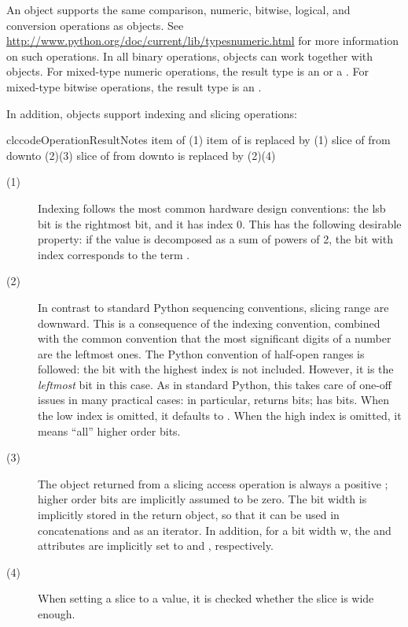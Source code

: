 An  object supports the same comparison, numeric,
bitwise, logical, and conversion operations as  objects. See
\url{http://www.python.org/doc/current/lib/typesnumeric.html} for more
information on such operations. In all binary operations,
 objects can work together with  objects.
For mixed-type numeric operations, the result type is an 
or a . For mixed-type bitwise operations, the result
type is an .

In addition,  objects support indexing and slicing
operations:

\begin{tableiii}{clc}{code}{Operation}{Result}{Notes}
	  {item  of }
	  {(1)}
	  {item  of  is replaced by } 
          {(1)}
          {slice of  from  downto } 
          {(2)(3)}
  	  {slice of  from  downto  is replaced
          by } 
          {(2)(4)}
\end{tableiii}

\begin{description}
\item[(1)] Indexing follows the most common hardware design
	  conventions: the lsb bit is the rightmost bit, and it has
	  index 0. This has the following desirable property: if the
	   value is decomposed as a sum of powers of 2,
	  the bit with index  corresponds to the term
	  .

\item[(2)] In contrast to standard Python sequencing conventions,
	  slicing range are downward. This is a consequence of the
	  indexing convention, combined with the common convention
	  that the most significant digits of a number are the
	  leftmost ones. The Python convention of half-open ranges is
	  followed: the bit with the highest index is not
	  included. However, it is the \emph{leftmost} bit in this
	  case. As in standard Python, this takes care of one-off
	  issues in many practical cases: in particular,
	   returns  bits;
	   has 
	  bits. When the low index  is omitted, it defaults
          to . When the high index  is omitted, it
          means ``all'' higher order bits.

\item[(3)] The object returned from a slicing access operation is always a
	  positive ; higher order bits are implicitly
	  assumed to be zero. The bit width is implicitly stored in
	  the return object, so that it can be used in concatenations
	  and as an iterator. In addition, for a bit width w, the
	   and  attributes are implicitly set to
	   and , respectively.  

\item[(4)] When setting a slice to a value, it is checked whether the
	  slice is wide enough.
\end{description}

